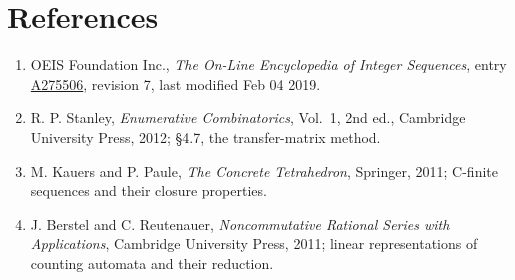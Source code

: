 \documentclass[11pt]{article}
\theoremstyle{definition}
\begin{document}
\section{References}

\begin{enumerate}

\item OEIS Foundation Inc., \emph{The On-Line Encyclopedia of Integer Sequences}, entry \href{https://oeis.org/A275506}{A275506}, revision 7, last modified Feb 04 2019.

\item R. P. Stanley, \emph{Enumerative Combinatorics}, Vol.~1, 2nd ed., Cambridge University Press, 2012; \S4.7, the transfer-matrix method.

\item M. Kauers and P. Paule, \emph{The Concrete Tetrahedron}, Springer, 2011; C-finite sequences and their closure properties.

\item J. Berstel and C. Reutenauer, \emph{Noncommutative Rational Series with Applications}, Cambridge University Press, 2011; linear representations of counting automata and their reduction.

\end{enumerate}
\end{document}
